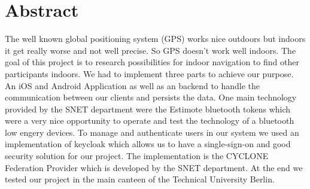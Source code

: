 \chapter*{Abstract}
\label{cha:abstract}

The well known global positioning system (GPS) works nice outdoors but indoors it get really worse and not well precise. So GPS doesn't work well indoors. The goal of this project is to research possibilities for indoor navigation to find other participants indoors. We had to implement three parts to achieve our purpose. An iOS and Android Application as well as an backend to handle the communication between our clients and persists the data. One main technology provided by the SNET department were the Estimote bluetooth tokens which were a very nice opportunity to operate and test the technology of a bluetooth low engery devices. To manage and authenticate users in our system we used an implementation of keycloak which allows us to have a single-sign-on and good security solution for our project. The implementation is the CYCLONE Federation Provider which is developed by the SNET department. At the end we tested our project in the main canteen of the Technical University Berlin.
